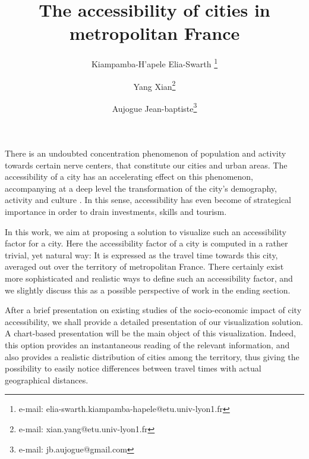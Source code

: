 \documentclass{vgtc}                          %
\title{The accessibility of cities in metropolitan France}
\author{ Kiampamba-H'apele Elia-Swarth \thanks{e-mail: elia-swarth.kiampamba-hapele@etu.univ-lyon1.fr}\\ %
\and Yang Xian\thanks{e-mail: xian.yang@etu.univ-lyon1.fr}\\ %
\and Aujogue Jean-baptiste\thanks{e-mail: jb.aujogue@gmail.com}} %
\begin{document}


\vspace{0.2cm}

\maketitle
There is an undoubted concentration phenomenon of population and activity towards certain nerve centers, that constitute our cities and urban areas. The accessibility of a city has an accelerating effect on this phenomenon, accompanying at a deep level the transformation of the city's demography, activity and culture \cite{RePEc:mtp:titles:0262561476}. In this sense, accessibility has even become of strategical importance in order to drain investments, skills and tourism.


 In this work, we aim at proposing a solution to visualize such an accessibility factor for a city. Here the accessibility factor of a city is computed in a rather trivial, yet natural way: It is expressed as the travel time towards this city, averaged out over the territory of metropolitan France. There certainly exist more sophisticated and realistic ways to define such an accessibility factor, and we slightly discuss this as a possible perspective of work in the ending section.


After a brief presentation on existing studies of the socio-economic impact of city accessibility, we shall provide a detailed presentation of our visualization solution. A chart-based presentation will be the main object of this visualization. Indeed, this option provides an instantaneous reading of the relevant information, and also provides a realistic distribution of cities among the territory, thus giving the possibility to easily notice differences between travel times with actual geographical distances.

\end{document}
